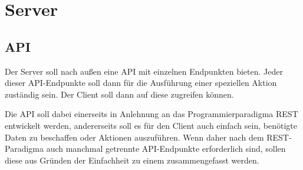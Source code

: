 \section{Server}


\subsection{\acl{API}}
Der Server soll nach außen eine \acs{API} mit einzelnen Endpunkten bieten.
Jeder dieser \acs{API}-Endpunkte soll dann für die Ausführung einer speziellen Aktion zuständig sein.
Der Client soll dann auf diese zugreifen können.

Die \acs{API} soll dabei einerseits in Anlehnung an das Programmierparadigma \ac{REST} entwickelt werden, andererseits soll es für den Client auch einfach sein, benötigte Daten zu beschaffen oder Aktionen auszuführen.
Wenn daher nach dem \acs{REST}-Paradigma auch manchmal getrennte \acs{API}-Endpunkte erforderlich sind, sollen diese aus Gründen der Einfachheit zu einem zusammengefasst werden.




